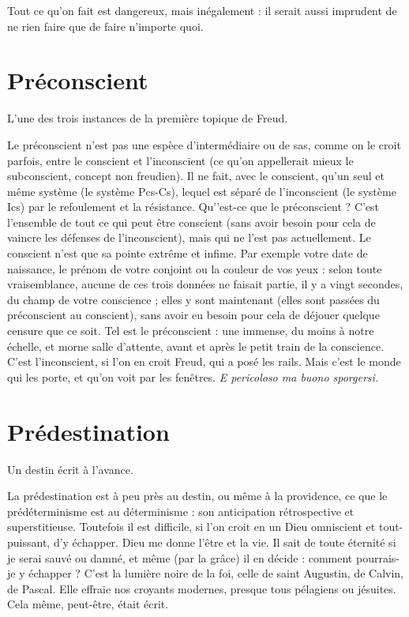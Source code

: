Tout ce qu’on fait est dangereux, mais inégalement : il serait aussi imprudent
de ne rien faire que de faire n’importe quoi.

\section{Préconscient}
L’une des trois instances de la première topique de
Freud.

Le préconscient n’est pas une espèce d’intermédiaire ou de sas, comme on
le croit parfois, entre le conscient et l'inconscient (ce qu’on appellerait mieux le
subconscient, concept non freudien). Il ne fait, avec le conscient, qu’un seul et
même système (le système Pcs-Cs), lequel est séparé de l'inconscient (le système
Ics) par le refoulement et la résistance. Qu'’est-ce que le préconscient ? C’est
l’ensemble de tout ce qui peut être conscient (sans avoir besoin pour cela de
vaincre les défenses de l'inconscient), mais qui ne l’est pas actuellement. Le
conscient n’est que sa pointe extrême et infime. Par exemple votre date de naissance,
le prénom de votre conjoint ou la couleur de vos yeux : selon toute vraisemblance,
aucune de ces trois données ne faisait partie, il y a vingt secondes,
du champ de votre conscience ; elles y sont maintenant (elles sont passées du
préconscient au conscient), sans avoir eu besoin pour cela de déjouer quelque
censure que ce soit. Tel est le préconscient : une immense, du moins à notre
échelle, et morne salle d’attente, avant et après le petit train de la conscience.
C’est l'inconscient, si l’on en croit Freud, qui a posé les rails. Mais c’est le
monde qui les porte, et qu’on voit par les fenêtres. {\it E pericoloso ma buono sporgersi.}

\section{Prédestination}
Un destin écrit à l’avance.

La prédestination est à peu près au destin, ou même à
la providence, ce que le prédéterminisme est au déterminisme : son anticipation
rétrospective et superstitieuse. Toutefois il est difficile, si l’on croit en un
Dieu omniscient et tout-puissant, d’y échapper. Dieu me donne l'être et la vie.
Il sait de toute éternité si je serai sauvé ou damné, et même (par la grâce) il en
décide : comment pourrais-je y échapper ? C’est la lumière noire de la foi, celle
de saint Augustin, de Calvin, de Pascal. Elle effraie nos croyants modernes,
presque tous pélagiens ou jésuites. Cela même, peut-être, était écrit.

